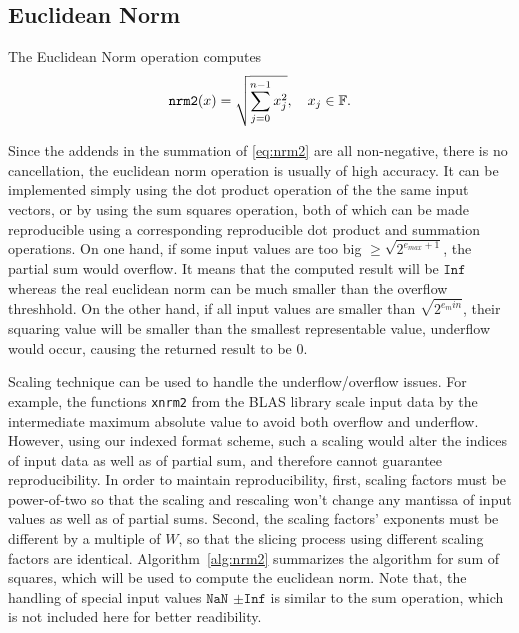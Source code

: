 \subsection{Euclidean Norm}
  \label{sec:compositeops_nrm}
    
    The Euclidean Norm operation computes
    \begin{equation}
        \texttt{nrm2}(x) = \sqrt{\sum_{j=0}^{n-1} x_j^2}, \quad x_j \in \mathbb{F}.
        \label{eq:nrm2}
    \end{equation}

    Since the addends in the summation of \eqref{eq:nrm2} are all non-negative,
    there is no cancellation, the euclidean norm operation
    is usually of high accuracy.
    It can be implemented simply using the dot product operation of the the same input vectors,
    or by using the sum squares operation,
    both of which can be made reproducible using a corresponding reproducible
    dot product and summation operations.
    On one hand, if some input values are too big $\geq \sqrt{2^{e_{max}+1}}$,
    the partial sum would overflow. It means that the computed result will
    be $\texttt{Inf}$ whereas the real euclidean norm can be much smaller than the
    overflow threshhold.
    On the other hand, if  all input values are smaller than $\sqrt{2^{e_min}}$,
    their squaring value will be smaller than the smallest representable value,
    underflow would occur, causing the returned result to be 0.

    Scaling technique can be used to handle the underflow/overflow issues.
    For example, the functions \texttt{xnrm2} from the BLAS library \cite{BLAS}
    scale input data by the intermediate maximum absolute value
    to avoid both overflow and underflow.
    However, using our indexed format scheme, such a scaling would alter
    the indices of input data as well as of partial sum, and therefore
    cannot guarantee reproducibility.
    In order to maintain reproducibility, 
    first, scaling factors must be power-of-two so that the scaling and rescaling
    won't change any mantissa of input values as well as of partial sums.
    Second, the scaling factors' exponents must be different by a multiple of $W$,
    so that the slicing process using different scaling factors are identical.
    Algorithm~\ref{alg:nrm2} summarizes the algorithm for sum of squares,
    which will be used to compute the euclidean norm.
    Note that, the handling of special input values $\texttt{NaN}$ $\pm \texttt{Inf}$
    is similar to the sum operation, which is not included here for better readibility.

